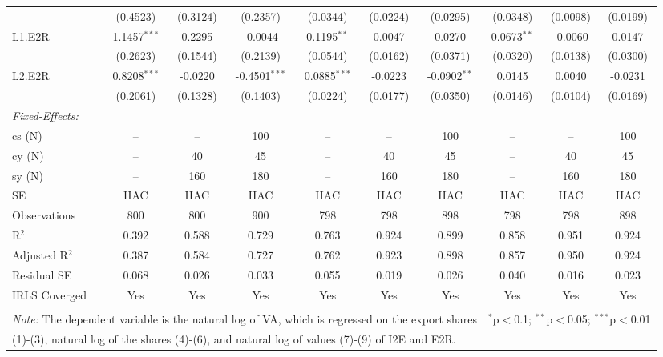\documentclass[a4paper]{article}
\begin{document}
\begin{table}[h!]
{\begin{tabular}[t]{lccccccccc}
  & (0.4523) & (0.3124) & (0.2357) & (0.0344) & (0.0224) & (0.0295) & (0.0348) & (0.0098) & (0.0199) \\ 
 L1.E2R & 1.1457$^{***}$ & 0.2295 & -0.0044 & 0.1195$^{**}$ & 0.0047 & 0.0270 & 0.0673$^{**}$ & -0.0060 & 0.0147 \\ 
  & (0.2623) & (0.1544) & (0.2139) & (0.0544) & (0.0162) & (0.0371) & (0.0320) & (0.0138) & (0.0300) \\ 
 L2.E2R & 0.8208$^{***}$ & -0.0220 & -0.4501$^{***}$ & 0.0885$^{***}$ & -0.0223 & -0.0902$^{**}$ & 0.0145 & 0.0040 & -0.0231 \\ 
  & (0.2061) & (0.1328) & (0.1403) & (0.0224) & (0.0177) & (0.0350) & (0.0146) & (0.0104) & (0.0169) \\ 
\midrule \emph{Fixed-Effects:} &   &   &   &   &   &  \\
cs (N) & -- & -- & 100 & -- & -- & 100 & -- & -- & 100\\
cy (N) & -- & 40 & 45 & -- & 40 & 45 & -- & 40 & 45\\
sy (N) & -- & 160 & 180 & -- & 160 & 180 & -- & 160 & 180\\
\midrule
SE & HAC & HAC & HAC &HAC &HAC &HAC &HAC &HAC &HAC \\
Observations & 800 & 800 & 900 & 798 & 798 & 898 & 798 & 798 & 898 \\ 
R$^{2}$ & 0.392 & 0.588 & 0.729 & 0.763 & 0.924 & 0.899 & 0.858 & 0.951 & 0.924 \\ 
Adjusted R$^{2}$ & 0.387 & 0.584 & 0.727 & 0.762 & 0.923 & 0.898 & 0.857 & 0.950 & 0.924 \\ 
Residual SE & 0.068 & 0.026 & 0.033 & 0.055 & 0.019 & 0.026 & 0.040 & 0.016 & 0.023 \\ 
IRLS Coverged & Yes & Yes & Yes & Yes & Yes & Yes & Yes & Yes & Yes \\ \bottomrule \\[-1em]
\multicolumn{7}{l}{\small \textit{Note:} The dependent variable is the natural log of VA, which is regressed on the  export shares}   & \multicolumn{3}{r}{$^{*}$p$<$0.1; $^{**}$p$<$0.05; $^{***}$p$<$0.01} \\ [-0.2em]
\multicolumn{10}{l}{\small \quad \quad \quad (1)-(3), natural log of the shares (4)-(6), and natural log of values (7)-(9) of I2E and E2R.} \\
\end{tabular} 
}
\end{table} 
\FloatBarrier
\end{document}
